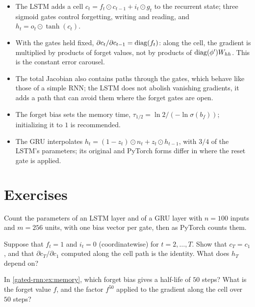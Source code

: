\begin{notechapter}
\begin{chaptersummary}
\begin{itemize}
  \item The LSTM adds a cell $c_t = f_t\odot c_{t-1} + i_t\odot g_t$ to the recurrent state; three sigmoid gates control
        forgetting, writing and reading, and $h_t = o_t\odot\tanh(c_t)$.
  \item With the gates held fixed, $\partial c_t/\partial c_{t-1} = \operatorname{diag}(f_t)$: along the cell, the gradient is multiplied by
        products of forget values, not by products of $\operatorname{diag}(\phi')W_{hh}$. This is the constant error carousel.
  \item The total Jacobian also contains paths through the gates, which behave like those of a
        simple RNN; the LSTM does not abolish vanishing gradients, it adds a path that can avoid
        them where the forget gates are open.
  \item The forget bias sets the memory time, $\tau_{1/2} = \ln2/(-\ln\sigma(b_f))$; initializing it to $1$ is
        recommended.
  \item The GRU interpolates $h_t = (1 - z_t)\odot n_t + z_t\odot h_{t-1}$, with $3/4$ of the LSTM's parameters; its
        original and PyTorch forms differ in where the reset gate is applied.
\end{itemize}
\end{chaptersummary}

\section*{Exercises}

\begin{exercise}\label{gated-rnn:exr:1}
Count the parameters of an LSTM layer and of a GRU layer with $n = 100$ inputs and $m = 256$
units, with one bias vector per gate, then as PyTorch counts them.
\end{exercise}

\begin{exercise}\label{gated-rnn:exr:2}
Suppose that $f_t = 1$ and $i_t = 0$ (coordinatewise) for $t = 2,\dots,T$. Show that $c_T = c_1$, and that
$\partial c_T/\partial c_1$ computed along the cell path is the identity. What does $h_T$ depend on?
\end{exercise}

\begin{exercise}\label{gated-rnn:exr:3}
In \cref{gated-rnn:ex:memory}, which forget bias gives a half-life of $50$ steps? What is the forget value
$f$, and the factor $f^{50}$ applied to the gradient along the cell over $50$ steps?
\end{exercise}


\end{notechapter}
